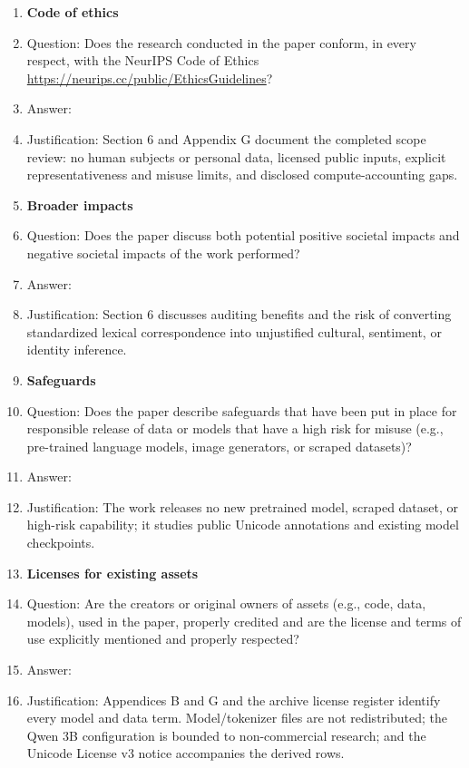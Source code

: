 \begin{enumerate}
\item {\bf Code of ethics}
  \item[] Question: Does the research conducted in the paper conform, in every respect, with the NeurIPS Code of Ethics \url{https://neurips.cc/public/EthicsGuidelines}?
  \item[] Answer: \answerYes{}
  \item[] Justification: Section 6 and Appendix G document the completed scope review: no human subjects or personal data, licensed public inputs, explicit representativeness and misuse limits, and disclosed compute-accounting gaps.

\item {\bf Broader impacts}
  \item[] Question: Does the paper discuss both potential positive societal impacts and negative societal impacts of the work performed?
  \item[] Answer: \answerYes{}
  \item[] Justification: Section 6 discusses auditing benefits and the risk of converting standardized lexical correspondence into unjustified cultural, sentiment, or identity inference.

\item {\bf Safeguards}
  \item[] Question: Does the paper describe safeguards that have been put in place for responsible release of data or models that have a high risk for misuse (e.g., pre-trained language models, image generators, or scraped datasets)?
  \item[] Answer: \answerNA{}
  \item[] Justification: The work releases no new pretrained model, scraped dataset, or high-risk capability; it studies public Unicode annotations and existing model checkpoints.

\item {\bf Licenses for existing assets}
  \item[] Question: Are the creators or original owners of assets (e.g., code, data, models), used in the paper, properly credited and are the license and terms of use explicitly mentioned and properly respected?
  \item[] Answer: \answerYes{}
  \item[] Justification: Appendices B and G and the archive license register identify every model and data term. Model/tokenizer files are not redistributed; the Qwen 3B configuration is bounded to non-commercial research; and the Unicode License v3 notice accompanies the derived rows.


\end{enumerate}
